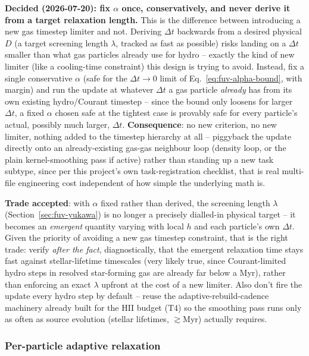 \textbf{Decided (2026-07-20): fix $\alpha$ once, conservatively, and
never derive it from a target relaxation length.} This is the
difference between introducing a new gas timestep limiter and not.
Deriving $\Delta t$ backwards from a desired physical $D$ (a target
screening length $\lambda$, tracked as fast as possible) risks landing
on a $\Delta t$ smaller than what gas particles already use for
hydro -- exactly the kind of new limiter (like a cooling-time
constraint) this design is trying to avoid. Instead, fix a single
conservative $\alpha$ (safe for the $\Delta t\to0$ limit of
Eq.~\ref{eq:fuv-alpha-bound}, with margin) and run the update at
whatever $\Delta t$ a gas particle \emph{already} has from its own
existing hydro/Courant timestep -- since the bound only loosens for
larger $\Delta t$, a fixed $\alpha$ chosen safe at the tightest case is
provably safe for every particle's actual, possibly much larger,
$\Delta t$. \textbf{Consequence}: no new  criterion,
no new limiter, nothing added to the timestep hierarchy at all --
piggyback the update directly onto an already-existing gas-gas
neighbour loop (density loop, or the plain 
kernel-smoothing pass if active) rather than standing up a new task
subtype, since per this project's own task-registration checklist,
that is real multi-file engineering cost independent of how simple the
underlying math is.

\textbf{Trade accepted}: with $\alpha$ fixed rather than derived, the
screening length $\lambda$ (Section~\ref{sec:fuv-yukawa}) is no longer
a precisely dialled-in physical target -- it becomes an
\emph{emergent} quantity varying with local $h$ and each particle's
own $\Delta t$. Given the priority of avoiding a new gas timestep
constraint, that is the right trade: verify \emph{after the fact},
diagnostically, that the emergent relaxation time stays fast against
stellar-lifetime timescales (very likely true, since Courant-limited
hydro steps in resolved star-forming gas are already far below a Myr),
rather than enforcing an exact $\lambda$ upfront at the cost of a new
limiter. Also don't fire the update every hydro step by default -- reuse
the adaptive-rebuild-cadence machinery already built for the HII budget
(T4) so the smoothing pass runs only as often as source evolution
(stellar lifetimes, $\gtrsim$Myr) actually requires.

\subsubsection{Per-particle adaptive relaxation}
\label{sec:fuv-adaptive-alpha}

